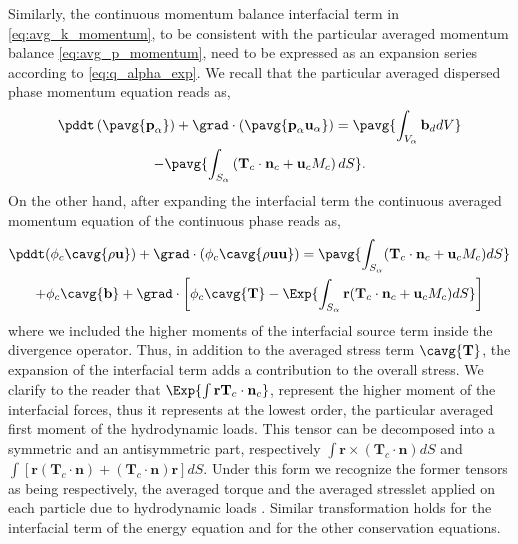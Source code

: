 Similarly, the continuous momentum balance interfacial term in \ref{eq:avg_k_momentum}, to be consistent with the particular averaged momentum balance \ref{eq:avg_p_momentum}, need to be expressed as an expansion series according to \ref{eq:q_alpha_exp}.  
We recall that the particular averaged dispersed phase momentum equation reads as,
\begin{multline}
    \pddt   \left(\pavg{\textbf{p}_\alpha}\right)
    + \grad \cdot (\pavg{\textbf{p}_\alpha \textbf{u}_\alpha})
    = \pavg{\int_{V_\alpha} \textbf{b}_d dV}\\
    - \pavg{\int_{S_\alpha} \left(\textbf{T}_c  \cdot \textbf{n}_c  + \textbf{u}_c M_c \right) d S}.
    \label{eq:classic_hybrid_momentum_p}
\end{multline}
On the other hand, after expanding the interfacial term the continuous averaged momentum equation of the continuous phase reads as, 
\begin{multline}
    \pddt (\phi_c\cavg{\rho\textbf{u}}) 
    + \grad \cdot ( \phi_c \cavg{\rho\textbf{uu}})
    = \pavg{\int_{S_\alpha} (\textbf{T}_c  \cdot \textbf{n}_c + \textbf{u}_c M_c) d S}\\
    +\phi_c\cavg{\textbf{b}}
    + \grad\cdot\left[
    \phi_c \cavg{\textbf{T}}
    - \Exp{\int_{S_\alpha} \textbf{r} (\textbf{T}_c  \cdot \textbf{n}_c + \textbf{u}_c M_c)dS}
    \right]
    \label{eq:classic_hybrid_momentum_c}
\end{multline}
where we included the higher moments of the interfacial source term inside the divergence operator. 
Thus, in addition to the averaged stress term $\cavg{\textbf{T}}$, the expansion of the interfacial term adds a contribution to the overall stress.
We clarify to the reader that $\Exp{\int \textbf{r}\textbf{T}_c  \cdot \textbf{n}_c}$, represent the higher moment of the interfacial forces, thus it represents at the lowest order, the particular averaged first moment of the hydrodynamic loads.
This tensor can be decomposed into a symmetric and an antisymmetric part, respectively $\int \textbf{r} \times (\textbf{T}_c\cdot\textbf{n}) dS$ and $\int \left[\textbf{r} (\textbf{T}_c\cdot\textbf{n}) +(\textbf{T}_c\cdot\textbf{n}) \textbf{r} \right]  dS$. 
Under this form we recognize the former tensors as being respectively, the averaged torque  and the averaged stresslet applied on each particle due to hydrodynamic loads \citep{kim2013microhydrodynamics}. 
Similar transformation holds for the interfacial term of the energy equation and for the other conservation equations. 

